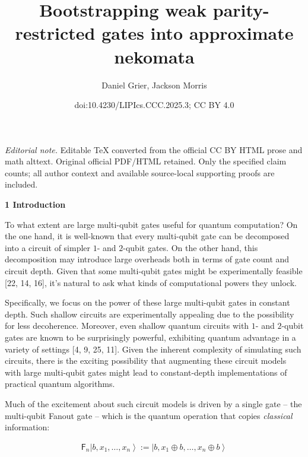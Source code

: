 \documentclass[10pt,a4paper]{article}
\title{Bootstrapping weak parity-restricted gates into approximate nekomata}
\author{Daniel Grier, Jackson Morris}
\date{doi:10.4230/LIPIcs.CCC.2025.3; CC BY 4.0}
\begin{document}
\maketitle
\noindent\textit{Editorial note.} Editable TeX converted from the official CC BY HTML prose and math alttext. Original official PDF/HTML retained. Only the specified claim counts; all author context and available source-local supporting proofs are included.\par\medskip


\par\medskip\noindent\textbf{
1 Introduction}\par




To what extent are large multi-qubit gates useful for quantum computation? On the one hand, it is well-known that every multi-qubit gate can be decomposed into a circuit of simpler $1$- and $2$-qubit gates. On the other hand, this decomposition may introduce large overheads both in terms of gate count and circuit depth. Given that some multi-qubit gates might be experimentally feasible [22, 14, 16], it’s natural to ask what kinds of computational powers they unlock.\par




Specifically, we focus on the power of these large multi-qubit gates in constant depth. Such shallow circuits are experimentally appealing due to the possibility for less decoherence. Moreover, even shallow quantum circuits with $1$- and $2$-qubit gates are known to be surprisingly powerful, exhibiting quantum advantage in a variety of settings [4, 9, 25, 11]. Given the inherent complexity of simulating such circuits, there is the exciting possibility that augmenting these circuit models with large multi-qubit gates might lead to constant-depth implementations of practical quantum algorithms.\par




Much of the excitement about such circuit models is driven by a single gate – the multi-qubit Fanout gate – which is the quantum operation that copies \emph{classical} information:\par


\[\begin{gathered}
\mathsf{F}_{n}\left|b,x_{1},\ldots,x_{n}\right\rangle:=\left|b,x_{1}\oplus b,\ldots,x_{n}\oplus b\right\rangle
\end{gathered}\]
\end{document}
